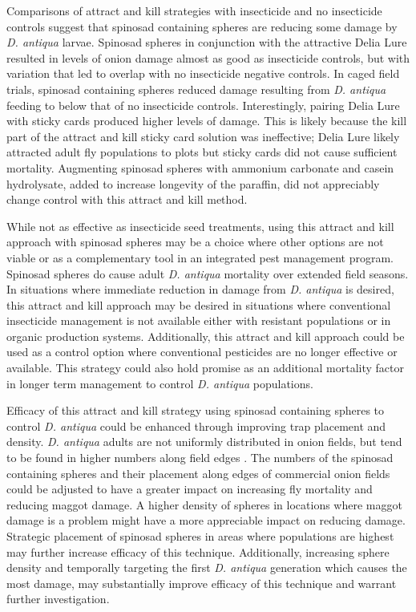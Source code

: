 \documentclass[num-refs]{wiley-article}
\begin{document}
Comparisons of attract and kill strategies with insecticide and no insecticide controls suggest that spinosad containing spheres are reducing some damage by \textit{D. antiqua} larvae.  Spinosad spheres in conjunction with the attractive Delia Lure resulted in levels of onion damage almost as good as insecticide controls, but with variation that led to overlap with no insecticide negative controls.  In caged field trials, spinosad containing spheres reduced damage resulting from \textit{D. antiqua} feeding to below that of no insecticide controls.  Interestingly, pairing Delia Lure with sticky cards produced higher levels of damage.  This is likely because the kill part of the attract and kill sticky card solution was ineffective; Delia Lure likely attracted adult fly populations to plots but sticky cards did not cause sufficient mortality.  Augmenting spinosad spheres with ammonium carbonate and casein hydrolysate, added to increase longevity of the paraffin,  did not appreciably change control with this attract and kill method.  

While not as effective as insecticide seed treatments, using this attract and kill approach with spinosad spheres may be a choice where other options are not viable or as a complementary tool in an integrated pest management program.  Spinosad spheres do cause adult \textit{D. antiqua} mortality over extended field seasons.  In situations where immediate reduction in damage from \textit{D. antiqua} is desired, this attract and kill approach may be desired in situations where conventional insecticide management is not available either with resistant populations or in organic production systems.  Additionally, this attract and kill approach could be used as a control option where conventional pesticides are no longer effective or available. This strategy could also hold promise as an additional mortality factor in longer term management to control \textit{D. antiqua} populations.  

Efficacy of this attract and kill strategy using spinosad containing spheres to control \textit{D. antiqua} could be enhanced through improving trap placement and density.  \textit{D. antiqua} adults are not uniformly distributed in onion fields, but tend to be found in higher numbers along field edges \citep{werling2006spatial}.  The numbers of the spinosad containing spheres and their placement along edges of commercial onion fields could be adjusted to have a greater impact on increasing fly mortality and reducing maggot damage.  A higher density of spheres in locations where maggot damage is a problem might have a more appreciable impact on reducing damage. Strategic placement of spinosad spheres in areas where populations are highest may further increase efficacy of this technique.  Additionally, increasing sphere density and temporally targeting the first \textit{D. antiqua} generation which causes the most damage, may substantially improve efficacy of this technique and warrant further investigation.  
\end{document}
